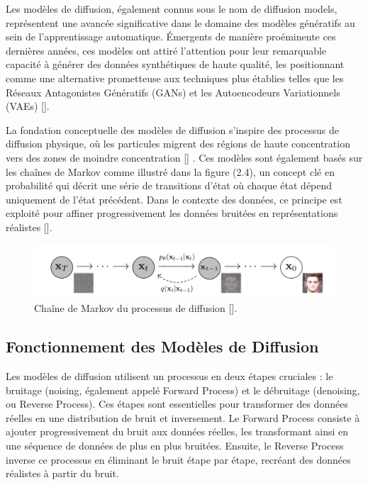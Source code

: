 Les modèles de diffusion, également connus sous le nom de diffusion models,
représentent une avancée significative dans le domaine des modèles génératifs
au sein de l'apprentissage automatique. Émergents de manière proéminente ces
dernières années, ces modèles ont attiré l'attention pour leur remarquable
capacité à générer des données synthétiques de haute qualité, les positionnant
comme une alternative prometteuse aux techniques plus établies telles que les
Réseaux Antagonistes Génératifs (GANs) et les Autoencodeurs Variationnels
(VAEs) [\cite{dhariwal2021diffusion}].

La fondation conceptuelle des modèles de diffusion s'inspire des processus de
diffusion physique, où les particules migrent des régions de haute
concentration vers des zones de moindre concentration [\cite{ho2020denoising}]
. Ces modèles sont également basés sur les chaînes de Markov comme illustré
dans la figure (2.4), un concept clé en probabilité qui décrit une série de
transitions d'état où chaque état dépend uniquement de l'état précédent. Dans
le contexte des données, ce principe est exploité pour affiner progressivement
les données bruitées en représentations réalistes [\cite{yang2022diffusion}].

\begin{figure}[hbt!]
	\centering
	\includegraphics[width=12cm]{images_pfe/markov.png}
	\caption{Chaîne de Markov du processus de diffusion [\cite{ho2020denoising}].}
	\label{fig:markov}
\end{figure}
\FloatBarrier

\subsection{Fonctionnement des Modèles de Diffusion}

Les modèles de diffusion utilisent un processus en deux étapes cruciales : le
bruitage (noising, également appelé Forward Process) et le débruitage
(denoising, ou Reverse Process). Ces étapes sont essentielles pour transformer
des données réelles en une distribution de bruit et inversement. Le Forward
Process consiste à ajouter progressivement du bruit aux données réelles, les
transformant ainsi en une séquence de données de plus en plus bruitées.
Ensuite, le Reverse Process inverse ce processus en éliminant le bruit étape
par étape, recréant des données réalistes à partir du bruit.

